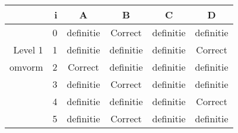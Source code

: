 \begin{tabular}{ rr| c|c|c|c}\hline\hline
     & i & \textbf{A} & \textbf{B} & \textbf{C} & \textbf{D}\\\hline

&0&definitie&Correct\cellcolor[gray]{0.6}&definitie&definitie\\
Level 1 & 1&definitie&definitie&definitie&Correct\cellcolor[gray]{0.6}\\
omvorm &2&Correct\cellcolor[gray]{0.6}&definitie&definitie&definitie\\
&3&definitie&Correct\cellcolor[gray]{0.6}&definitie&definitie\\
&4&definitie&definitie&definitie&Correct\cellcolor[gray]{0.6}\\
&5&definitie&Correct\cellcolor[gray]{0.6}&definitie&definitie\\
\hline\end{tabular}\par\ \newline

